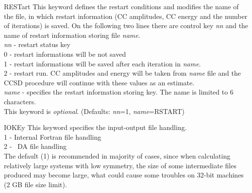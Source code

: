 \begin{keywordlist}
\item[RESTart]
This keyword defines the restart conditions and modifies the name of the file,
in which restart information (CC amplitudes, CC energy and the number
of iterations) is saved. On the following two lines there
are control key {\it nn} and the name of restart information storing file
{\it name}.\\
{\it nn} - restart status key\\
0 - restart informations will be not saved\\
1 - restart informations will be saved after each iteration in
                  {\it name}.\\
2 - restart run. CC amplitudes and energy will be taken from
                  {\it name} file and the CCSD procedure will continue with
                   these values as an estimate.\\
{\it name} - specifies the restart information storing key. The name is limited
to 6 characters.\\
This keyword is {\it optional}. (Defaults: {\it nn}=1, {\it
  name}=RSTART)
\item[IOKEy]
This keyword specifies the input-output file handling.\\
1 - Internal Fortran file handling\\
2 - \molcas\ DA file handling\\
The default (1) is recommended in majority of cases, since when calculating relatively
large systems with low symmetry, the size of some intermediate files produced may become large,
what could cause some troubles on 32-bit machines (2 GB file size limit).

\end{keywordlist}
